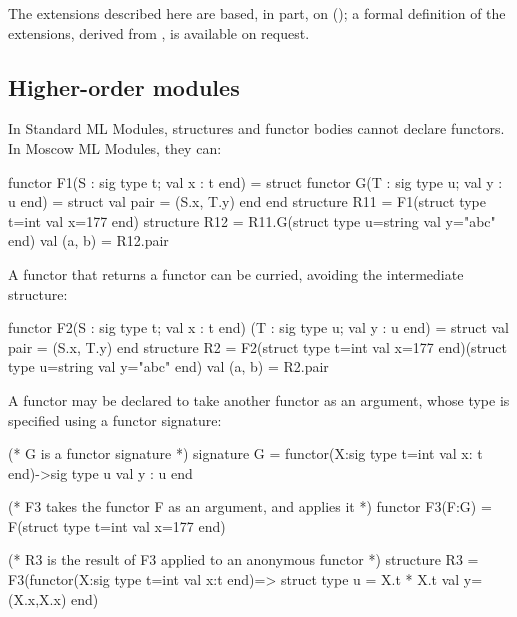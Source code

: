 \documentclass[fleqn,a4paper]{article}
\begin{document}
The extensions described here are based, in part, on 
(\cite{Russo:TypesForModules,Russo:FirstClassStructures});
a formal definition of the extensions,
derived from \cite{Milner:1990:TheDefinition, Milner:1997:TheDefinition},
is available on request.



\subsection{Higher-order modules}

\label{sec-ho-modules}

In Standard ML Modules, structures and functor bodies cannot declare
functors.  In Moscow ML Modules, they can:

\begin{program}
functor F1(S : sig type t; val x : t end) = struct
    functor G(T : sig type u; val y : u end) = struct val pair = (S.x, T.y) end
end
structure R11 = F1(struct type t=int val x=177 end)
structure R12 = R11.G(struct type u=string val y="abc" end)
val (a, b) = R12.pair
\end{program}

\noindent 
A functor that returns a functor can be curried, avoiding the intermediate
structure:

\begin{program}
functor F2(S : sig type t; val x : t end) (T : sig type u; val y : u end) = 
   struct val pair = (S.x, T.y) end
structure R2 = 
   F2(struct type t=int val x=177 end)(struct type u=string val y="abc" end)
val (a, b) = R2.pair
\end{program}

\noindent 


\noindent 
A functor may be declared to take another functor as an argument, whose
type is specified using a functor signature:

\begin{program}
(* G is a functor signature *)
signature G = functor(X:sig type t=int val x: t end)->sig type u val y : u end

(* F3 takes the functor F as an argument, and applies it *)
functor F3(F:G) = F(struct type t=int val x=177 end) 

(* R3 is the result of F3 applied to an anonymous functor *)        
structure R3 = F3(functor(X:sig type t=int val x:t end)=> 
                  struct type u = X.t * X.t val y= (X.x,X.x) end)
\end{program}
\end{document}
